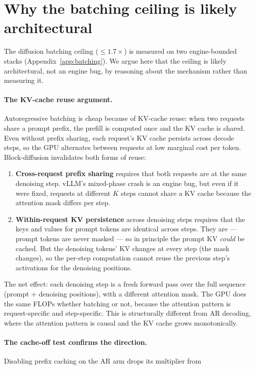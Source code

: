 \section{Why the batching ceiling is likely architectural}
\label{app:batching_architectural} The diffusion batching ceiling ($\leq 1.7\times$) is measured on two
engine-bounded stacks (Appendix~\ref{app:batching}). We argue here that
the ceiling is likely architectural, not an engine bug, by reasoning
about the mechanism rather than measuring it. \paragraph{The KV-cache reuse argument.}
Autoregressive batching is cheap because of KV-cache reuse: when two
requests share a prompt prefix, the prefill is computed once and the KV
cache is shared. Even without prefix sharing, each request's KV cache
persists across decode steps, so the GPU alternates between requests at
low marginal cost per token. Block-diffusion invalidates both forms of reuse: \begin{enumerate}[nosep]
\item \textbf{Cross-request prefix sharing} requires that both requests
are at the same denoising step. vLLM's mixed-phase crash is an engine
bug, but even if it were fixed, requests at different $K$ steps cannot
share a KV cache because the attention mask differs per step.
\item \textbf{Within-request KV persistence} across denoising steps
requires that the keys and values for prompt tokens are identical across
steps. They are --- prompt tokens are never masked --- so in principle
the prompt KV \emph{could} be cached. But the denoising tokens' KV changes
at every step (the mask changes), so the per-step computation cannot
reuse the previous step's activations for the denoising positions.
\end{enumerate} The net effect: each denoising step is a fresh forward pass over the full
sequence (prompt + denoising positions), with a different attention mask.
The GPU does the same FLOPs whether batching or not, because the
attention pattern is request-specific and step-specific. This is
structurally different from AR decoding, where the attention pattern is
causal and the KV cache grows monotonically. \paragraph{The cache-off test confirms the direction.}
Disabling prefix caching on the AR arm drops its multiplier from
